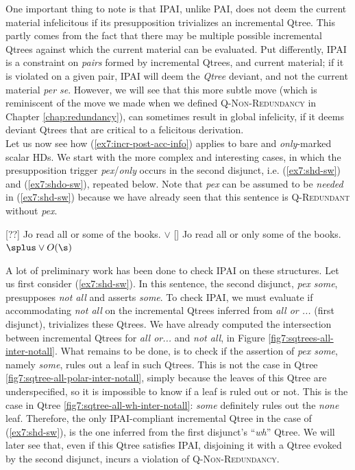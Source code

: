 One important thing to note is that IPAI, unlike PAI, does not deem the current material infelicitous if its presupposition trivializes an incremental Qtree. This partly comes from the fact that there may be multiple possible incremental Qtrees against which the current material can be evaluated. Put differently, IPAI is a constraint on \textit{pairs} formed by incremental Qtrees, and current material; if it is violated on a given pair, IPAI will deem the \textit{Qtree} deviant, and not the current material \textit{per se}. However, we will see that this more subtle move (which is reminiscent of the move we made when we defined \textsc{Q-Non-Redundancy} in Chapter \ref{chap:redundancy}), can sometimes result in global infelicity, if it deems deviant Qtrees that are critical to a felicitous derivation.\\

 
Let us now see how (\ref{ex7:incr-post-acc-info}) applies to bare and \textit{only}-marked scalar HDs. We start with the more complex and interesting cases, in which the presupposition trigger \textit{pex}/\textit{only} occurs in the second disjunct, i.e. (\ref{ex7:shd-sw}) and (\ref{ex7:shdo-sw}), repeated below. Note that \textit{pex} can be assumed to be \textit{needed} in (\ref{ex7:shd-sw}) because we have already seen that this sentence is \textsc{Q-Redundant} without \textit{pex}.

\begin{exe}
	[??] {Jo read all or some of the books. \hfill \splus{} $\vee$ \s}
	 {Jo read all or only some of the books. \hfill $\splus\vee O(\s)$}
\end{exe}

A lot of preliminary work has been done to check IPAI on these structures. Let us first consider (\ref{ex7:shd-sw}). In this sentence, the second disjunct, \textit{pex some}, presupposes \textit{not all} and asserts \textit{some}. To check IPAI, we must evaluate if accommodating \textit{not all} on the incremental Qtrees inferred from \textit{all or ...} (first disjunct), trivializes these Qtrees. We have already computed the intersection between incremental Qtrees for \textit{all or...} and \textit{not all}, in Figure \ref{fig7:sqtrees-all-inter-notall}. What remains to be done, is to check if the assertion of \textit{pex some}, namely \textit{some}, rules out a leaf in such Qtrees. This is not the case in Qtree \ref{fig7:sqtree-all-polar-inter-notall}, simply because the leaves of this Qtree are underspecified, so it is impossible to know if a leaf is ruled out or not. This is the case in Qtree \ref{fig7:sqtree-all-wh-inter-notall}: \textit{some} definitely rules out the \textit{none} leaf. Therefore, the only IPAI-compliant incremental Qtree in the case of (\ref{ex7:shd-sw}), is the one inferred from the  first disjunct's ``\textit{wh}'' Qtree. We will later see that, even if this Qtree satisfies IPAI, disjoining it with a Qtree evoked by the second disjunct, incurs a violation of \textsc{Q-Non-Redundancy}.

